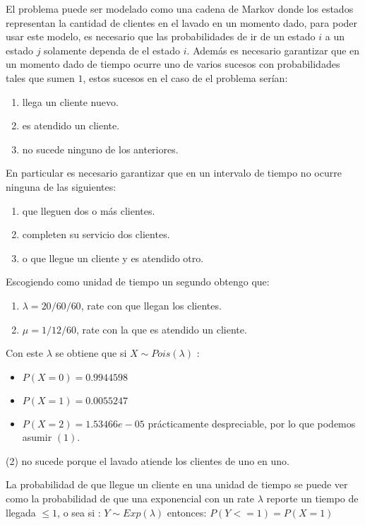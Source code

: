 \documentclass[14pt]{extarticle}
\begin{document}
El problema puede ser modelado como una cadena de Markov donde los estados representan la cantidad de clientes en el lavado en un momento dado, para poder usar este modelo, es necesario que las probabilidades de ir de un estado $i$ a un estado $j$ solamente dependa de el estado $i$. Además es necesario garantizar que en un momento dado de tiempo ocurre uno de varios sucesos con probabilidades tales que sumen $1$, estos sucesos en el caso de el problema serían:

\begin{enumerate}
    \item llega un cliente nuevo.
    \item es atendido un cliente.
    \item no sucede ninguno de los anteriores.
\end{enumerate}
	
En particular es necesario garantizar que en un intervalo de tiempo no ocurre ninguna de las siguientes:
\begin{enumerate}
    \item que lleguen dos o más clientes.
    \item completen su servicio dos clientes.
    \item o que llegue un cliente y es atendido otro.  
\end{enumerate}

Escogiendo como unidad de tiempo un segundo obtengo que:
\begin{enumerate}
	\item $\lambda = 20 / 60 / 60$, rate con que llegan los clientes.
	\item $\mu = 1 / 12 / 60$, rate con la que es atendido un cliente.
\end{enumerate}
	
Con este $\lambda$ se obtiene que si $X \sim Pois(\lambda)$ :
\begin{itemize}
    \item $P( X = 0 )  = 0.9944598$
    \item $P( X = 1 )  = 0.0055247$
    \item $P( X = 2 )  = 1.53466e-05$ prácticamente despreciable, por lo que podemos asumir $(1)$.
\end{itemize}

(2) no sucede porque el lavado atiende los clientes de uno en uno.

La probabilidad de que llegue un cliente en una unidad de tiempo se puede ver como la probabilidad de que una exponencial con un rate $\lambda$ reporte un tiempo de llegada $ \leq 1$, o sea si : $Y \sim Exp(\lambda)$ entonces: $P( Y <= 1) = P( X = 1)$
\end{document}
